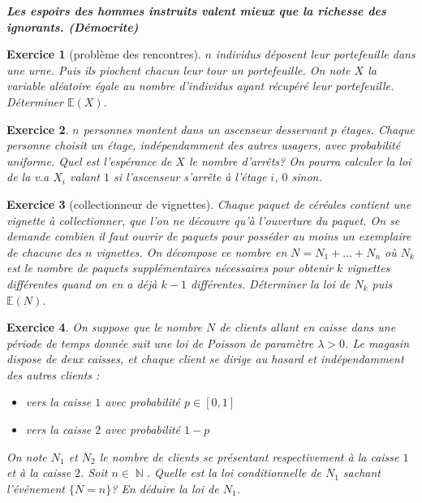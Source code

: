 \documentclass[12pt,a4paper]{article}
\DeclareMathOperator{\N}{\mathbb{N}}
\newtheorem{Exo}{Exercice}
\begin{document}
\emph{\textbf{
Les espoirs des hommes instruits valent mieux que la richesse des ignorants.
(Démocrite)
}}




\begin{Exo}[problème des rencontres]
	$n$ individus déposent leur portefeuille dans une urne. Puis ils piochent chacun leur tour un portefeuille. On note $X$ la variable aléatoire égale au nombre d'individus ayant récupéré leur portefeuille. Déterminer $\mathbb{E}(X)$. 
\end{Exo}

\begin{Exo}
	$n$ personnes montent dans un ascenseur desservant $p$ étages.  Chaque personne choisit un étage, indépendamment des autres usagers, avec probabilité uniforme. Quel est l'espérance de $X$ le nombre d'arrêts? On pourra calculer la loi de la v.a $X_i$ valant $1$ si l'ascenseur s'arrête à l'étage $i$, $0$ sinon.
\end{Exo}

\begin{Exo}[collectionneur de vignettes]
Chaque paquet de céréales contient une vignette à collectionner, que l'on ne découvre qu'à l'ouverture du paquet. On se demande combien il faut ouvrir de
paquets pour posséder au moins un exemplaire de chacune des $n$ vignettes.
On décompose ce nombre en $N=N_1+...+N_n$ où $N_k$ est le nombre de paquets supplémentaires nécessaires pour obtenir $k$ vignettes différentes quand on en a déjà $k-1$ différentes. Déterminer la loi de $N_k$ puis $\mathbb{E}(N)$.
\end{Exo} 

\begin{Exo}
	On suppose que le nombre $N$ de clients allant en caisse dans une période de temps donnée suit une loi de Poisson de paramètre $\lambda>0$. Le magasin dispose de deux caisses, et chaque client se dirige au hasard et indépendamment des autres clients :
\begin{itemize}
	\item vers la caisse $1$ avec probabilité $p\in[0,1]$
	\item vers la caisse $2$ avec probabilité $1-p$
\end{itemize}

On note $N_1$ et $N_2$ le nombre de clients se présentant respectivement à la caisse $1$ et à la caisse $2$. Soit $n\in\N$. Quelle est la loi conditionnelle de $N_1$ sachant l’événement $\{N=n\}$? En déduire la loi de $N_1$.
\end{Exo}
\end{document}
